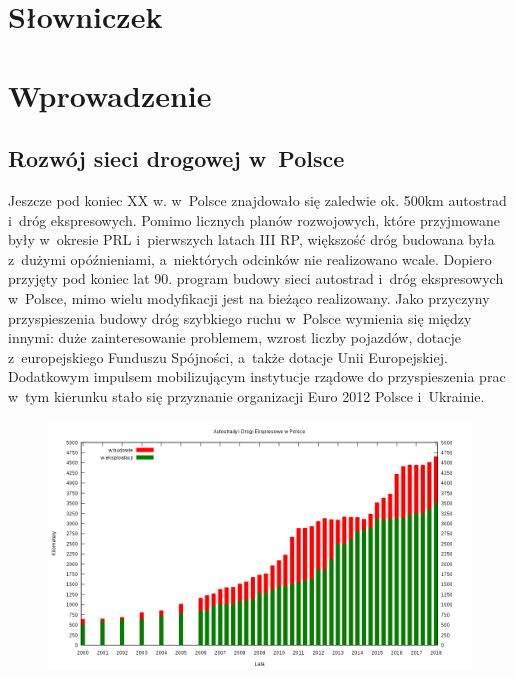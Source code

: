\setcounter{tocdepth}{2}
\tableofcontents


\chapter{Słowniczek}
\printglossaries

\chapter{Wprowadzenie}
\section{Rozwój sieci drogowej w~Polsce}

Jeszcze pod koniec XX w. w~Polsce znajdowało się zaledwie ok. 500km autostrad i~dróg ekspresowych. Pomimo licznych planów rozwojowych, które przyjmowane były w~okresie PRL i~pierwszych latach III RP, większość dróg budowana była z~dużymi opóźnieniami, a~niektórych odcinków nie realizowano wcale.\newline
Dopiero przyjęty pod koniec lat 90. program budowy sieci autostrad i~dróg ekspresowych w~Polsce, mimo wielu modyfikacji jest na bieżąco realizowany. Jako przyczyny\cite{siec-drogowa-IIIrp} przyspieszenia budowy dróg szybkiego ruchu w~Polsce wymienia się między innymi: duże zainteresowanie problemem, wzrost liczby pojazdów, dotacje z~europejskiego Funduszu Spójności, a~także dotacje Unii Europejskiej. Dodatkowym impulsem mobilizującym instytucje rządowe do przyspieszenia prac w~tym kierunku stało się przyznanie organizacji Euro 2012 Polsce i~Ukrainie.\newline
\begin{figure}[h]
\includegraphics[width=\textwidth]{images/1024px-PL-Motorways.png}
\end{figure} \newline
